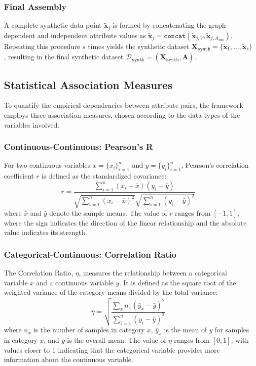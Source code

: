 \subsubsection{Final Assembly}

A complete synthetic data point $\tilde{\mathbf{x}}_j$ is formed by concatenating the graph-dependent and independent attribute values as $\tilde{\mathbf{x}}_j = \mathtt{concat}(\tilde{\mathbf{x}}_{j, V}, \tilde{\mathbf{x}}_{j, A_{\mathtt{iso}}})$. Repeating this procedure $s$ times yields the synthetic dataset $\mathbf{X}_{\mathtt{synth}} = \{\tilde{\mathbf{x}}_1, \ldots, \tilde{\mathbf{x}}_s\}$, resulting in the final synthetic dataset $\mathcal{D}_{\mathtt{synth}} = (\mathbf{X}_{\mathtt{synth}}, \mathbf{A})$.

\subsection{Statistical Association Measures}
\label{sec:association_scores}

To quantify the empirical dependencies between attribute pairs, the framework employs three association measures, chosen according to the data types of the variables involved.

\subsubsection{Continuous-Continuous: Pearson's R}
For two continuous variables $x = \{x_i\}_{i=1}^n$ and $y = \{y_i\}_{i=1}^n$, Pearson's correlation coefficient $r$ is defined as the standardized covariance:
\begin{equation}
    r = \frac{\sum_{i=1}^{n}(x_i-\bar{x})(y_i-\bar{y})}{\sqrt{\sum_{i=1}^{n}(x_i-\bar{x})^2}\sqrt{\sum_{i=1}^{n}(y_i-\bar{y})^2}}
\end{equation}
where $\bar{x}$ and $\bar{y}$ denote the sample means. The value of $r$ ranges from $[-1, 1]$, where the sign indicates the direction of the linear relationship and the absolute value indicates its strength.

\subsubsection{Categorical-Continuous: Correlation Ratio}
The Correlation Ratio, $\eta$, measures the relationship between a categorical variable $x$ and a continuous variable $y$. It is defined as the square root of the weighted variance of the category means divided by the total variance:
\begin{equation}
    \eta = \sqrt{\frac{\sum_{x} n_x(\bar{y}_x - \bar{y})^2}{\sum_{i=1}^{n}(y_i - \bar{y})^2}}
\end{equation}
where $n_x$ is the number of samples in category $x$, $\bar{y}_x$ is the mean of $y$ for samples in category $x$, and $\bar{y}$ is the overall mean. The value of $\eta$ ranges from $[0, 1]$, with values closer to 1 indicating that the categorical variable provides more information about the continuous variable.

